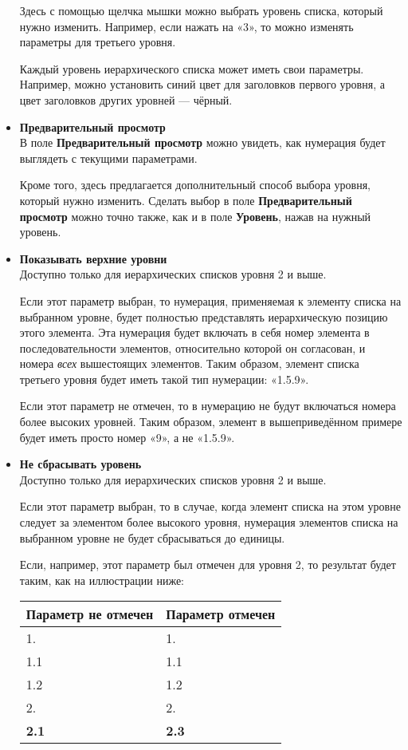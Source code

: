 ﻿\documentclass[a4paper,10pt]{article}
\begin{document}
\begin{itemize}
Здесь с помощью щелчка мышки можно выбрать уровень списка, который нужно изменить. Например, если нажать на «3», то можно изменять параметры для третьего уровня.

Каждый уровень иерархического списка может иметь свои параметры. Например, можно установить синий цвет для заголовков первого уровня, а цвет заголовков других уровней — чёрный.
\item \textbf{Предварительный просмотр}\\
В поле \textbf{Предварительный просмотр} можно увидеть, как нумерация будет выглядеть с текущими параметрами.

Кроме того, здесь предлагается дополнительный способ выбора уровня, который нужно изменить. Сделать выбор в поле \textbf{Предварительный просмотр} можно точно также, как и в поле \textbf{Уровень}, нажав на нужный уровень.
\item \textbf{Показывать верхние уровни}\\
Доступно только для иерархических списков уровня 2 и выше.

Если этот параметр выбран, то нумерация, применяемая к элементу списка на выбранном уровне, будет полностью представлять иерархическую позицию этого элемента. Эта нумерация будет включать в себя номер элемента в последовательности элементов, относительно которой он согласован, и номера \textit{всех} вышестоящих элементов. Таким образом, элемент списка третьего уровня будет иметь такой тип нумерации: «1.5.9».

Если этот параметр не отмечен, то в нумерацию не будут включаться номера более высоких уровней. Таким образом, элемент в вышеприведённом примере будет иметь просто номер «9», а не «1.5.9».
\item \textbf{Не сбрасывать уровень}\\
Доступно только для иерархических списков уровня 2 и выше. 

Если этот параметр выбран, то в случае, когда элемент списка на этом уровне следует за элементом более высокого уровня, нумерация элементов списка на выбранном уровне не будет сбрасываться до единицы.

Если, например, этот параметр был отмечен для уровня 2, то результат будет таким, как на иллюстрации ниже:

\begin{center}
\begin{tabular}{  m{4cm}  m{10cm}  }
 \textbf{Параметр не отмечен} & \textbf{Параметр отмечен} \\ 
 \hline
  1. & 1.\\
  1.1 & 1.1\\
  1.2 & 1.2\\
  2. & 2.\\
  \textbf{2.1} & \textbf{2.3}\\
\end{tabular}
\end{center}
 

\end{itemize}
\end{document}
